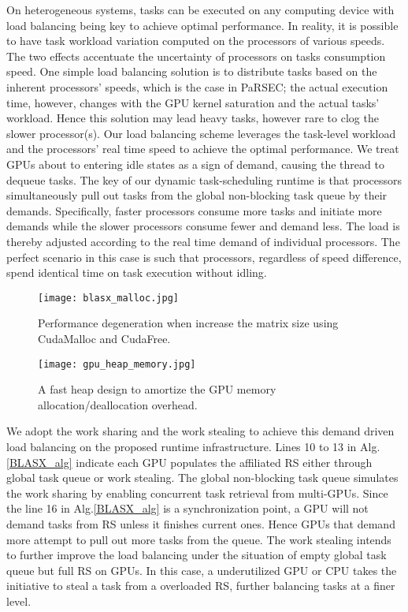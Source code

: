 \documentclass[conference]{IEEEtran}
\begin{document}
On heterogeneous systems, tasks can be executed on any computing device with load balancing 
being key to achieve optimal performance. In reality, it is possible 
to have task workload variation computed on the processors of various speeds. The two effects 
accentuate the uncertainty of processors on tasks consumption speed. One simple load balancing solution is to distribute tasks based on the inherent processors' speeds, which is the
case in PaRSEC; the actual execution time, however, changes with the GPU kernel
saturation and the actual tasks' workload. Hence this solution may lead heavy tasks, however rare to clog the slower processor(s). Our load balancing scheme leverages the task-level workload and the processors' 
real time speed to achieve the optimal performance. We treat GPUs about to entering idle states
as a sign of demand, causing the thread to dequeue tasks. The key of our dynamic 
task-scheduling runtime is that processors simultaneously pull out tasks from the 
global non-blocking task queue by their demands. Specifically, faster processors 
consume more tasks and initiate more demands while the slower processors consume fewer 
and demand less. The load is thereby adjusted according to the real time demand of individual 
processors. The perfect scenario in this case is such that processors, regardless of speed 
difference, spend identical time on task execution without idling.

\begin{figure}[t]
\centering
\texttt{[image: blasx\_malloc.jpg]}
\caption{Performance degeneration when increase the matrix size using CudaMalloc and CudaFree.}
\label{blasx_malloc}
\centering
\texttt{[image: gpu\_heap\_memory.jpg]}
\caption{A fast heap design to amortize the GPU memory allocation/deallocation overhead.}
\label{heap_memory}
\vspace{-0.23in}
\end{figure}

We adopt the work sharing and the work stealing to achieve this demand driven load balancing on the 
proposed runtime infrastructure. Lines 10 to 13 in Alg.\ref{BLASX_alg} indicate each GPU populates
the affiliated RS either through global task queue or work stealing. The global non-blocking task queue 
simulates the work sharing by enabling concurrent task retrieval from multi-GPUs. Since the
line 16 in Alg.\ref{BLASX_alg} is a synchronization point, a GPU will not demand tasks from
RS unless it finishes current ones. Hence GPUs that demand more attempt to pull out more tasks from
the queue. The work stealing intends to further
improve the load balancing under the situation of empty global task queue but full RS on GPUs. In 
this case, a underutilized GPU or CPU takes the initiative to steal a task from a overloaded RS,
further balancing tasks at a finer level.
\end{document}
